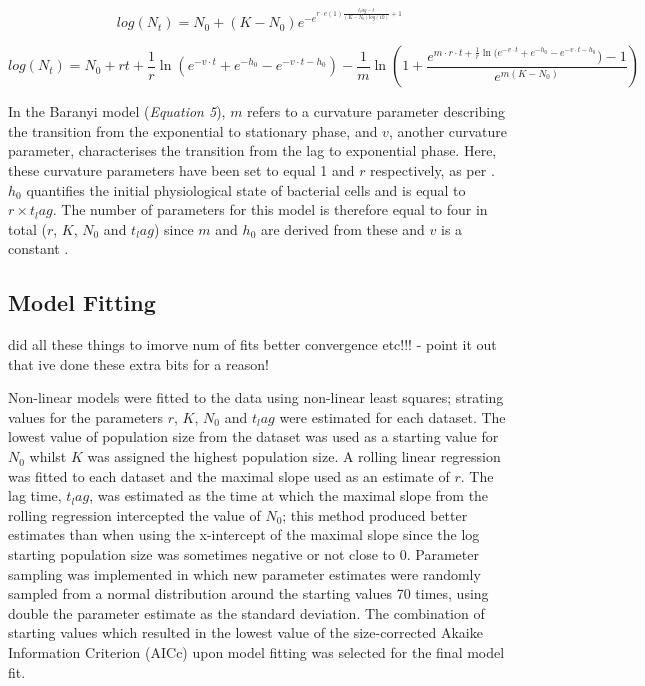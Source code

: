 \documentclass[11pt]{article}
\begin{document}
\begin{linenumbers}
            \begin{equation}
                log(N_t) = N_0 + (K - N_0) e^{-e^{r \cdot e(1) \frac{t_lag - t}{(K - N_0) log(10)}+1}}
            \end{equation}
            
            \begin{equation}
                log(N_t) = N_0 + r t + \frac{1}{r} \ln(e^{-v \cdot t} + e^{-h_0} - e^{-v \cdot t -h_0}) - \frac{1}{m} \ln(1 + \frac{e^{m \cdot r \cdot t + \frac{1}{r} \ln(e^{-v \cdot t} + e^{-h_0} - e^{-v \cdot t -h_0}}) - 1}{e^{m(K - N_0)}})
            \end{equation}
            
            In the Baranyi model (\emph{Equation 5}), $m$ refers to a curvature parameter describing the transition from the exponential to stationary phase, and $v$, another curvature parameter, characterises the transition from the lag to exponential phase. Here, these curvature parameters have been set to equal 1 and $r$ respectively, as per \cite{baranyi_simple_1997}. $h_0$ quantifies the initial physiological state of bacterial cells and is equal to $r \times t_lag$. The number of parameters for this model is therefore equal to four in total ($r$, $K$, $N_0$ and $t_lag$) since $m$ and $h_0$ are derived from these and $v$ is a constant \citep{grijspeerdt_estimating_1999}. 


        \subsection{Model Fitting}
        
        
        did all these things to imorve num of fits better convergence etc!!! - point it out that ive done these extra bits for a reason!
        
            Non-linear models were fitted to the data using non-linear least squares; strating values for the parameters $r$, $K$, $N_0$ and $t_lag$ were estimated for each dataset. The lowest value of population size from the dataset was used as a starting value for $N_0$ whilst $K$ was assigned the highest population size. A rolling linear regression was fitted to each dataset and the maximal slope used as an estimate of $r$. The lag time, $t_lag$, was estimated as the time at which the maximal slope from the rolling regression intercepted the value of $N_0$; this method produced better estimates than when using the x-intercept of the maximal slope since the log starting population size was sometimes negative or not close to 0. Parameter sampling was implemented in which new parameter estimates were randomly sampled from a normal distribution around the starting values 70 times, using double the parameter estimate as the standard deviation. The combination of starting values which resulted in the lowest value of the size-corrected Akaike Information Criterion (AICc) upon model fitting was selected for the final model fit. 
            

\end{linenumbers}
\end{document}
